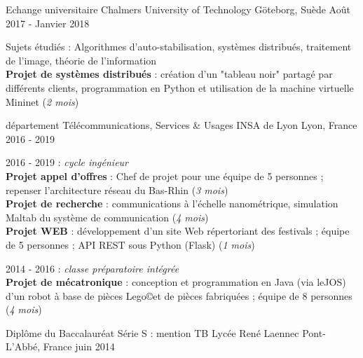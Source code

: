 

\begin{cventries}

  \cventry
    {Echange universitaire} %
    {Chalmers University of Technology} %
    {Göteborg, Suède} %
    {Août 2017 - Janvier 2018} %
    {
      \begin{cvitems} %
        \item {Sujets étudiés : Algorithmes d'auto-stabilisation, systèmes distribués, traitement de l'image, théorie de l'information \\
        \textbf{Projet de systèmes distribués} : création d'un "tableau noir" partagé par différents clients, programmation en Python et utilisation de la machine virtuelle Mininet (\textit{2 mois})}
      \end{cvitems}
    }

  \cventry
    {département Télécommunications, Services \& Usages} %
    {INSA de Lyon} %
    {Lyon, France} %
    {2016 - 2019} %
    {
      \begin{cvitems} %
        \item {2016 - 2019 : \emph{cycle ingénieur} \\
        \textbf{Projet appel d'offres} : Chef de projet pour une équipe de 5 personnes ; repenser l'architecture réseau du Bas-Rhin (\textit{3 mois}) \\
        \textbf{Projet de recherche} : communications à l'échelle nanométrique, simulation Maltab du système de communication (\textit{4 mois}) \\
        \textbf{Projet WEB} : développement d'un site Web répertoriant des festivals ; équipe de 5 personnes ; API REST sous Python (Flask) (\textit{1 mois})}
        \item {2014 - 2016 : \emph{classe préparatoire intégrée} \\
        \textbf{Projet de mécatronique} : conception et programmation en Java (via leJOS) d'un robot à base de pièces Lego\copyright et de pièces fabriquées ; équipe de 8 personnes (\textit{4 mois})}
      \end{cvitems}
    } 
  \cventryS
    {Diplôme du Baccalauréat Série S : mention TB} %
    {Lycée René Laennec} %
    {Pont-L'Abbé, France} %
    {juin 2014} %
    
\end{cventries}

